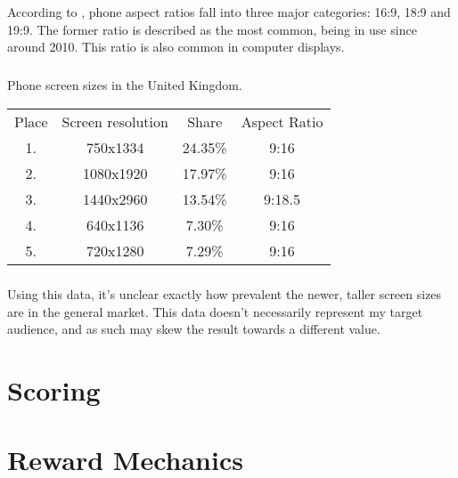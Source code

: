 \documentclass{scrreprt}
\let\cite\textcite
\let\citep\autocite
\begin{document}
According to \cite{Techlector001}, phone aspect ratios fall into three major categories: 16:9, 18:9 and 19:9. The former ratio is described as the most common, being in use since around 2010. This ratio is also common in computer displays.

\paragraph{}

Phone screen sizes in the United Kingdom. \citep{DeviceAtlas2019}

\begin{tabular}{ c c c c }

  Place & Screen resolution & Share   & Aspect Ratio \\

  1.    & 750x1334          & 24.35\% & 9:16         \\

  2.    & 1080x1920         & 17.97\% & 9:16         \\

  3.    & 1440x2960         & 13.54\% & 9:18.5       \\

  4.    & 640x1136          & 7.30\%  & 9:16         \\

  5.    & 720x1280          & 7.29\%  & 9:16         \\
\end{tabular}

\paragraph{}

Using this data, it's unclear exactly how prevalent the newer, taller screen sizes are in the general market. This data doesn't necessarily represent my target audience, and as such may skew the result towards a different value.

\chapter{Scoring}

\chapter{Reward Mechanics}

\printbibliography
\end{document}
